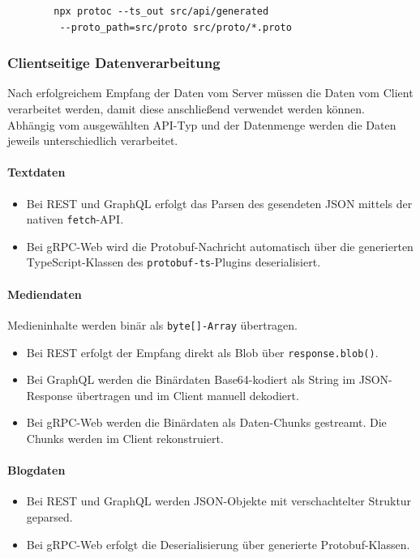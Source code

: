 \begin{enumerate}
	\begin{verbatim}
		npx protoc --ts_out src/api/generated
		 --proto_path=src/proto src/proto/*.proto
	\end{verbatim}
	
	\subsubsection*{Clientseitige Datenverarbeitung}
	Nach erfolgreichem Empfang der Daten vom Server müssen die Daten vom Client verarbeitet werden, damit diese anschließend verwendet werden können. Abhängig vom ausgewählten API-Typ und der Datenmenge werden die Daten jeweils unterschiedlich verarbeitet. 
	
	\paragraph{Textdaten}
	\begin{itemize}
		\item Bei REST und GraphQL erfolgt das Parsen des gesendeten JSON mittels der nativen \texttt{fetch}-API.
		\item Bei gRPC-Web wird die Protobuf-Nachricht automatisch über die generierten TypeScript-Klassen des \texttt{protobuf-ts}-Plugins deserialisiert.
	\end{itemize}
	
	\paragraph{Mediendaten}
	
	Medieninhalte werden binär als \texttt{byte[]-Array} übertragen.
	\begin{itemize}
		\item Bei REST erfolgt der Empfang direkt als Blob über \texttt{response.blob()}.
		\item Bei GraphQL werden die Binärdaten Base64-kodiert als String im JSON-Response übertragen und im Client manuell dekodiert.
		\item Bei gRPC-Web werden die Binärdaten als Daten-Chunks gestreamt. Die Chunks werden im Client rekonstruiert.
	\end{itemize}
	
	\paragraph{Blogdaten}
	\begin{itemize}
		\item Bei REST und GraphQL werden JSON-Objekte mit verschachtelter Struktur geparsed.
		\item Bei gRPC-Web erfolgt die Deserialisierung über generierte Protobuf-Klassen.
	\end{itemize}
	

\end{enumerate}
